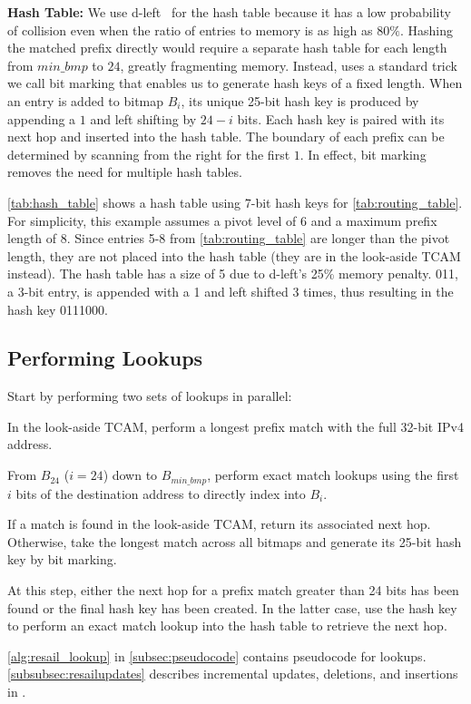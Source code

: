 {\bf Hash Table:} \label{subsec:building_hash_table} We use d-left~\cite{dleft} for the hash table because it has a low probability of collision even when the ratio of entries to memory is as high as $80\%$. Hashing the matched prefix directly would require a separate hash table for each length from $min\_bmp$ to $24$, greatly fragmenting memory. Instead, \resail uses a standard trick~\cite{network_algorithmics} we call bit marking that enables us to generate hash keys of a fixed length. When an entry is added to bitmap $B_{i}$, its unique 25-bit hash key is produced by appending a $1$ and left shifting by $24-i$ bits. Each hash key is paired with its next hop and inserted into the hash table. The boundary of each prefix can be determined by scanning from the right for the first $1$. In effect, bit marking removes the need for multiple hash tables.

\cref{tab:hash_table} shows a hash table using 7-bit hash keys for \cref{tab:routing_table}. For simplicity, this example assumes a pivot level of 6 and a maximum prefix length of 8. Since entries 5-8 from \cref{tab:routing_table} are longer than the pivot length, they are not placed into the hash table (they are in the look-aside TCAM instead). The hash table has a size of 5 due to d-left's 25\% memory penalty. 011, a 3-bit entry, is appended with a 1 and left shifted 3 times, thus resulting in the hash key 0111000.

\subsection{Performing Lookups} \label{subsec:resail_lookups}

Start by performing two sets of lookups in parallel:
\begin{inlist}
  \item In the look-aside TCAM, perform a longest prefix match with the full 32-bit IPv4 address.
  \item From $B_{24}$ ($i=24$) down to $B_{min\_bmp}$, perform exact match lookups using the first $i$ bits of the destination address to directly index into $B_{i}$.
\end{inlist}

If a match is found in the look-aside TCAM, return its associated next hop. Otherwise, take the longest match across all bitmaps and generate its 25-bit hash key by bit marking.

At this step, either the next hop for a prefix match greater than 24 bits has been found or the final hash key has been created. In the latter case, use the hash key to perform an exact match lookup into the hash table to retrieve the next hop. 

\cref{alg:resail_lookup} in \cref{subsec:pseudocode} contains pseudocode for \resail lookups. \cref{subsubsec:resailupdates} describes incremental updates, deletions, and insertions in \resail.